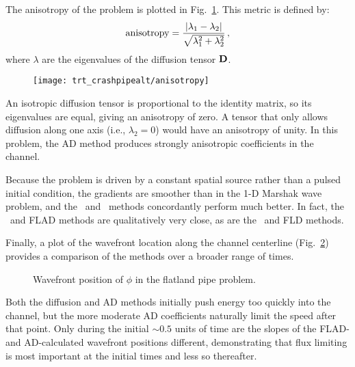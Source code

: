 The anisotropy of the problem is plotted in Fig.~\ref{fig:crashaltAnisotropy}.
This metric is defined by:
\begin{equation}\label{eq:anisotropyMetric}
  \text{anisotropy} = \frac{\left| \lambda_1 - \lambda_2 \right| }{ \sqrt{
  \lambda_1^2 + \lambda_2^2} }\,,
\end{equation}
where $\lambda$ are the eigenvalues of the diffusion tensor $\mathbf{D}$.
%
\begin{figure}[htb]
  \centering
  \texttt{[image: trt\_crashpipealt/anisotropy]}
  \label{fig:crashaltAnisotropy}
\end{figure}
%
An isotropic diffusion tensor is proportional to the identity matrix, so its
eigenvalues are equal, giving an anisotropy of zero. A tensor that only allows
diffusion along one axis (i.e., $\lambda_2 = 0$) would have an anisotropy of
unity. In this problem, the AD method produces strongly anisotropic coefficients
in the channel.

Because the problem is driven by a constant spatial source rather than a pulsed
initial condition, the gradients are smoother than in the 1-D Marshak wave
problem, and the \Pone\ and \APone\ methods concordantly perform much better.
In fact, the
\APone\ and FLAD methods are qualitatively very close, as are the \Pone\ and FLD
methods.

\thesisclearpage

Finally, a plot of the wavefront location along the channel centerline
(Fig.~\ref{fig:crashaltWavefront}) provides a comparison of the methods over a
broader range of times.
%
\begin{figure}[tb]
  \centering\small
  
  \caption{Wavefront position of $\phi$ in the flatland pipe problem.}
  \label{fig:crashaltWavefront}
\end{figure}
%
Both the diffusion and AD methods initially push energy too quickly into the
channel, but the more moderate AD coefficients naturally limit the speed after
that point. Only during the initial $\mathop{\sim} 0.5$ units of time are the slopes of the
FLAD- and AD-calculated wavefront positions different, demonstrating that
flux limiting is most important at the initial times and less so thereafter.

